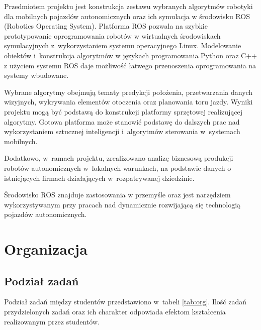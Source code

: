 Przedmiotem projektu jest konstrukcja zestawu wybranych algorytmów robotyki dla
mobilnych pojazdów autonomicznych oraz ich symulacja w środowisku ROS (Robotics
Operating
System). Platforma ROS pozwala na szybkie prototypowanie oprogramowania robotów
w wirtualnych środowiskach symulacyjnych z~wykorzystaniem systemu operacyjnego
Linux.
Modelowanie obiektów i~konstrukcja algorytmów w językach programowania Python
oraz C++ z użyciem systemu ROS daje możliwość łatwego przenoszenia
oprogramowania na systemy wbudowane.

Wybrane algorytmy obejmują tematy predykcji położenia, przetwarzania danych
wizyjnych, wykrywania elementów otoczenia oraz planowania toru jazdy. Wyniki
projektu mogą być podstawą do konstrukcji platformy sprzętowej realizującej
algorytmy. Gotowa platforma może stanowić podstawę do dalszych prac nad
wykorzystaniem sztucznej inteligencji i~algorytmów sterowania w~systemach
mobilnych.

Dodatkowo, w~ramach projektu, zrealizowano analizę biznesową produkcji robotów
autonomicznych w~lokalnych warunkach, na podstawie danych o istniejących
firmach działających w~rozpatrywanej dziedzinie.

Środowisko ROS znajduje zastosowania w przemyśle oraz jest narzędziem
wykorzystywanym przy pracach nad dynamicznie rozwijającą się technologią
pojazdów autonomicznych.

\chapter{Organizacja}


\section{Podział zadań}
Podział zadań między studentów przedstawiono w~tabeli \ref{tab:org}.
Ilość zadań przydzielonych zadań oraz ich charakter odpowiada efektom
kształcenia realizowanym przez studentów.

